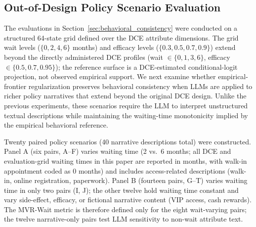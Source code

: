 \documentclass[11pt]{article}
\begin{document}
\clearpage
\subsection{Out-of-Design Policy Scenario Evaluation}
\label{sec:out_of_design}

The evaluations in Section~\ref{sec:behavioral_consistency} were conducted on a structured 64-state grid defined over the DCE attribute dimensions. The grid wait levels ($\{0,2,4,6\}$ months) and efficacy levels ($\{0.3,0.5,0.7,0.9\}$) extend beyond the directly administered DCE profiles (wait $\in \{0,1,3,6\}$, efficacy $\in \{0.5,0.7,0.95\}$); the reference surface is a DCE-estimated conditional-logit projection, not observed empirical support. We next examine whether empirical-frontier regularization preserves behavioral consistency when LLMs are applied to richer policy narratives that extend beyond the original DCE design. Unlike the previous experiments, these scenarios require the LLM to interpret unstructured textual descriptions while maintaining the waiting-time monotonicity implied by the empirical behavioral reference.

Twenty paired policy scenarios (40 narrative descriptions total) were constructed. Panel A (six pairs, A--F) varies waiting time (2 vs.\ 6 months; all DCE and evaluation-grid waiting times in this paper are reported in months, with walk-in appointment coded as 0 months) and includes access-related descriptions (walk-in, online registration, paperwork). Panel B (fourteen pairs, G--T) varies waiting time in only two pairs (I, J); the other twelve hold waiting time constant and vary side-effect, efficacy, or fictional narrative content (VIP access, cash rewards). The MVR-Wait metric is therefore defined only for the eight wait-varying pairs; the twelve narrative-only pairs test LLM sensitivity to non-wait attribute text.
\end{document}

